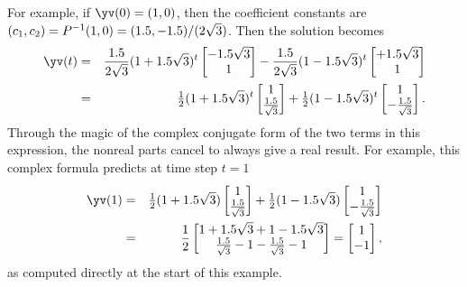 \begin{example}
\begin{solution}
For example, if \(\yv(0)=(1,0)\), then the coefficient constants are \((c_1,c_2)=P^{-1}(1,0)=(1.5,-1.5)/(2\sqrt3)\).
Then the solution becomes
\begin{eqnarray*}
\yv(t)&=&\frac \i{2\sqrt3}(1+\i\sqrt3)^t\begin{bmatrix} -\i\sqrt3\\1 \end{bmatrix}
-\frac{\i}{2\sqrt3}(1-\i\sqrt3)^t\begin{bmatrix} +\i\sqrt3\\1 \end{bmatrix}
\\&=&\tfrac 12(1+\i\sqrt3)^t\begin{bmatrix} 1\\\frac \i{\sqrt3} \end{bmatrix}
+\tfrac12(1-\i\sqrt3)^t\begin{bmatrix} 1\\-\frac \i{\sqrt3} \end{bmatrix}.
\end{eqnarray*}
Through the magic of the complex conjugate form of the two terms in this expression, the nonreal parts cancel to always give a real result.
For example, this complex formula predicts at time step \(t=1\)
\begin{eqnarray*}
\yv(1)&=&\tfrac 12(1+\i\sqrt3)\begin{bmatrix} 1\\\frac \i{\sqrt3} \end{bmatrix}
+\tfrac12(1-\i\sqrt3)\begin{bmatrix} 1\\-\frac \i{\sqrt3} \end{bmatrix}
\\&=&\frac12\begin{bmatrix} 1+\i\sqrt3+1-\i\sqrt3\\
\frac \i{\sqrt3}-1-\frac \i{\sqrt3}-1 \end{bmatrix}
=\begin{bmatrix} 1\\-1 \end{bmatrix},
\end{eqnarray*}
as computed directly at the start of this example.
\end{solution}
\end{example}


